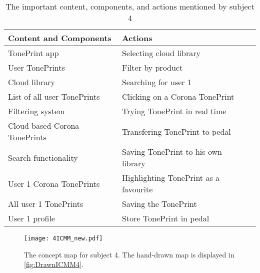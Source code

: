 \begin{table}[H]
\begin{minipage}[b]{\linewidth}\centering
	\begin{tabular} {|l|l|l|} \hline
		\rowcolor{xGray25} \textbf{Content and Components} & \textbf{Actions} \\  \hline
		TonePrint app & Selecting cloud library \\
		User TonePrints & Filter by product \\
		Cloud library & Searching for user 1 \\
		List of all user TonePrints & Clicking on a Corona TonePrint \\
		Filtering system & Trying TonePrint in real time \\
		Cloud based Corona TonePrints & Transfering TonePrint to pedal \\
		Search functionality & Saving TonePrint to his own library \\
		User 1 Corona TonePrints & Highlighting TonePrint as a favourite \\
		All user 1 TonePrints & Saving the TonePrint \\
		User 1 profile & Store TonePrint in pedal \\ \hline
	\end{tabular}
	\caption{The important content, components, and actions mentioned by subject 4}
	\label{tab:Subject4ContentActions}
\end{minipage}
\end{table}
%
\newpage
%
\begin{figure}[H]
	\centering
	\texttt{[image: 4ICMM\_new.pdf]}
	\caption{The concept map for subject 4. The hand-drawn map is displayed in \autoref{fig:DrawnICMM4}.}
	\label{fig:ICMM4}
\end{figure}


